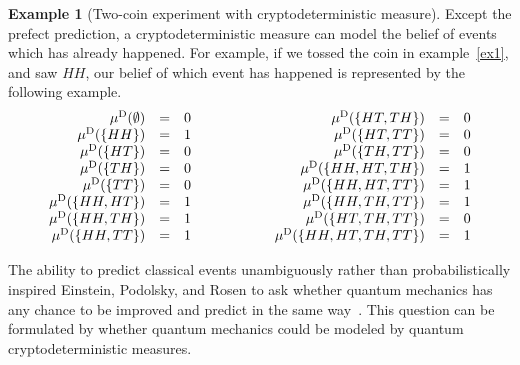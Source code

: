 \documentclass[12pt]{iopart}
\theoremstyle{plain}
\theoremstyle{definition}
\newtheorem{example}[thm]{Example}
\theoremstyle{remark}
\begin{document}
\begin{example}[Two-coin experiment with cryptodeterministic measure]\label{ex4}Except
the prefect prediction, a cryptodeterministic measure can model the
belief of events which has already happened. For example, if we tossed
the coin in example~\ref{ex1}, and saw $HH$, our belief of which
event has happened is represented by the following example.
\begin{equation}
\begin{array}{c@{\qquad\qquad}c}
\begin{array}{rcl}
\mu^{\mathrm{D}}(\emptyset) & = & 0\\
\mu^{\mathrm{D}}(\{HH\}) & = & 1\\
\mu^{\mathrm{D}}(\{HT\}) & = & 0\\
\mu^{\mathrm{D}}(\{TH\}) & = & 0\\
\mu^{\mathrm{D}}(\{TT\}) & = & 0\\
\mu^{\mathrm{D}}(\{HH,HT\}) & = & 1\\
\mu^{\mathrm{D}}(\{HH,TH\}) & = & 1\\
\mu^{\mathrm{D}}(\{HH,TT\}) & = & 1
\end{array} & \begin{array}{rcl}
\mu^{\mathrm{D}}(\{HT,TH\}) & = & 0\\
\mu^{\mathrm{D}}(\{HT,TT\}) & = & 0\\
\mu^{\mathrm{D}}(\{TH,TT\}) & = & 0\\
\mu^{\mathrm{D}}(\{HH,HT,TH\}) & = & 1\\
\mu^{\mathrm{D}}(\{HH,HT,TT\}) & = & 1\\
\mu^{\mathrm{D}}(\{HH,TH,TT\}) & = & 1\\
\mu^{\mathrm{D}}(\{HT,TH,TT\}) & = & 0\\
\mu^{\mathrm{D}}(\{HH,HT,TH,TT\}) & = & 1
\end{array}\end{array}
\end{equation}
\end{example}

The ability to predict classical events unambiguously rather than
probabilistically inspired Einstein, Podolsky, and Rosen to ask whether
quantum mechanics has any chance to be improved and predict in the
same way~\cite{EPR1935,peres1995quantum,544199,Mermin2007}. This
question can be formulated by whether quantum mechanics could be modeled
by quantum cryptodeterministic measures.
\end{document}
